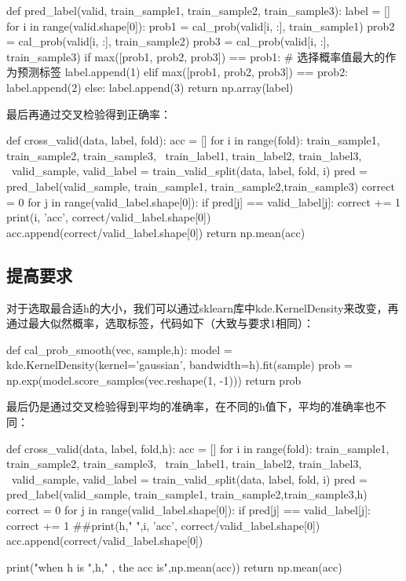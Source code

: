 \documentclass[UTF8,a4paper,10pt]{ctexart}
\begin{document}
\begin{python}
   def pred_label(valid, train_sample1, train_sample2, train_sample3):
    label = []
    for i in range(valid.shape[0]):
        prob1 = cal_prob(valid[i, :], train_sample1)
        prob2 = cal_prob(valid[i, :], train_sample2)
        prob3 = cal_prob(valid[i, :], train_sample3)
        if max([prob1, prob2, prob3]) == prob1:  # 选择概率值最大的作为预测标签
            label.append(1)
        elif max([prob1, prob2, prob3]) == prob2:
            label.append(2)
        else:
            label.append(3)
    return np.array(label)

\end{python}

最后再通过交叉检验得到正确率：

\begin{python}
   def cross_valid(data, label, fold):
    acc = []
    for i in range(fold):
        train_sample1, train_sample2, train_sample3, \
        train_label1, train_label2, train_label3, \
        valid_sample, valid_label = train_valid_split(data, label, fold, i)
        pred = pred_label(valid_sample, train_sample1, train_sample2,train_sample3)
        correct = 0
        for j in range(valid_label.shape[0]):
            if pred[j] == valid_label[j]:
                correct += 1
        print(i, 'acc', correct/valid_label.shape[0])
        acc.append(correct/valid_label.shape[0])
    return np.mean(acc)
\end{python}


\subsection{提高要求}

对于选取最合适h的大小，我们可以通过sklearn库中kde.KernelDensity来改变，再通过最大似然概率，选取标签，代码如下（大致与要求1相同）：

\begin{python}
   def cal_prob_smooth(vec, sample,h):
    model = kde.KernelDensity(kernel='gaussian', bandwidth=h).fit(sample)
    prob = np.exp(model.score_samples(vec.reshape(1, -1)))
    return prob

\end{python}

最后仍是通过交叉检验得到平均的准确率，在不同的h值下，平均的准确率也不同：

\begin{python}
   def cross_valid(data, label, fold,h):
    acc = []
    for i in range(fold):
        train_sample1, train_sample2, train_sample3, \
        train_label1, train_label2, train_label3, \
        valid_sample, valid_label = train_valid_split(data, label, fold, i)
        pred = pred_label(valid_sample, train_sample1, train_sample2,train_sample3,h)
        correct = 0
        for j in range(valid_label.shape[0]):
            if pred[j] == valid_label[j]:
                correct += 1
        ##print(h,"   ",i, 'acc', correct/valid_label.shape[0])
        acc.append(correct/valid_label.shape[0])

    print("when h is ",h," , the acc is",np.mean(acc))
    return np.mean(acc)

\end{python}
\end{document}
